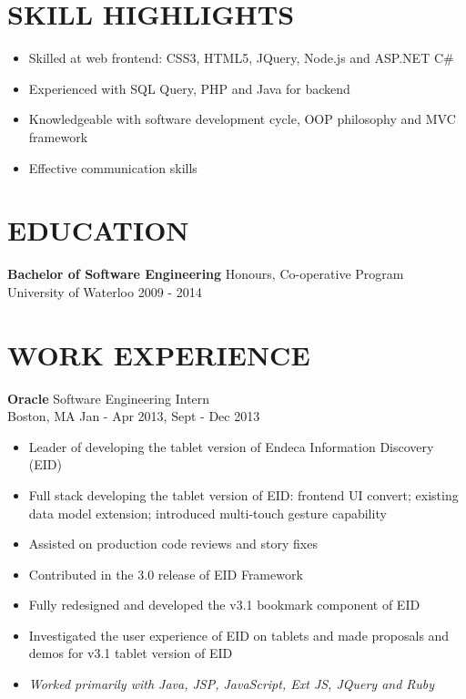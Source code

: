 \documentclass[line,margin]{res}
\begin{document}

\address{
{\it (+1)226 929 2310}
\ \ \ \ \ 
\href{mailto:mollylyb@gmail.com}{\it mollylyb@gmail.com} 
\ \ \ \ \ 
\href{http://mollybing.github.com}{\it mollybing.github.com}
}
 
\begin{resume}
 
\section{\uppercase{skill highlights}}
\begin{itemize}
\item Skilled at web frontend: CSS3, HTML5, JQuery, Node.js and ASP.NET C\#
\item Experienced with SQL Query, PHP and Java for backend
\item Knowledgeable with software development cycle, OOP philosophy and MVC framework
\item Effective communication skills
\end{itemize}

\section{\uppercase{Education}}
{\bf Bachelor of Software Engineering} \hfill Honours, Co-operative Program \\
University of Waterloo \hfill 2009 - 2014

\section{\uppercase{work Experience}}
{\bf Oracle} \hfill Software Engineering Intern \\
Boston, MA \hfill Jan - Apr 2013, Sept - Dec 2013
\begin{itemize}
\item Leader of developing the tablet version of Endeca Information Discovery (EID)
\item Full stack developing the tablet version of EID: frontend UI convert; existing data model extension; introduced multi-touch gesture capability
\item Assisted on production code reviews and story fixes
\item Contributed in the 3.0 release of EID Framework
\item Fully redesigned and developed the v3.1 bookmark component of EID
\item Investigated the user experience of EID on tablets and made proposals and demos for v3.1 tablet version of EID
\item {\it Worked primarily with Java, JSP, JavaScript, Ext JS, JQuery and Ruby}
\end{itemize} 
 

\end{resume}
\end{document}
